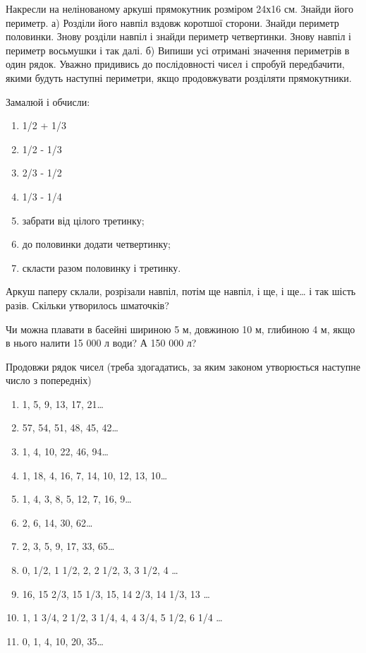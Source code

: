 \problem
Накресли на нелінованому аркуші прямокутник розміром 24х16 см.
Знайди його периметр.
а) Розділи його навпіл вздовж коротшої сторони.
Знайди периметр половинки.
Знову розділи навпіл і знайди периметр четвертинки.
Знову навпіл і периметр восьмушки і так далі.
б) Випиши усі отримані значення периметрів в один рядок.
Уважно придивись до послідовності чисел і спробуй передбачити,
якими будуть наступні периметри, якщо продовжувати розділяти прямокутники.


\problem
Замалюй і обчисли:
\begin{multicols}{2}
    \begin{enumerate}
        \item 1/2 + 1/3 
        \item 1/2 - 1/3 
        \item 2/3 - 1/2 
        \item 1/3 - 1/4 
        \item забрати від цілого третинку;
        \item до половинки додати четвертинку;
        \item скласти разом половинку і третинку.
    \end{enumerate}
\end{multicols}


\problem
Аркуш паперу склали, розрізали навпіл, потім ще навпіл, і ще, і ще\ldots
і так шість разів.
Скільки утворилось шматочків?


\problem
Чи можна плавати в басейні шириною 5 м, довжиною 10 м, глибиною 4 м,
якщо в нього налити 15 000 л води? А 150 000 л?


\problem
Продовжи рядок чисел (треба здогадатись, за яким законом утворюється
наступне число з попередніх)
\begin{enumerate}
    \item 1, 5, 9, 13, 17, 21…
    \item 57, 54, 51, 48, 45, 42…
    \item 1, 4, 10, 22, 46, 94…
    \item 1, 18, 4, 16, 7, 14, 10, 12, 13, 10…
    \item 1, 4, 3, 8, 5, 12, 7, 16, 9…
    \item 2, 6, 14, 30, 62…
    \item 2, 3, 5, 9, 17, 33, 65…
    \item 0, 1/2, 1 1/2, 2, 2 1/2, 3, 3 1/2, 4 …
    \item 16, 15 2/3, 15 1/3, 15, 14 2/3, 14 1/3, 13 …
    \item 1, 1 3/4, 2 1/2, 3 1/4, 4, 4 3/4, 5 1/2, 6 1/4 …
    \item 0, 1, 4, 10, 20, 35… 
\end{enumerate}



